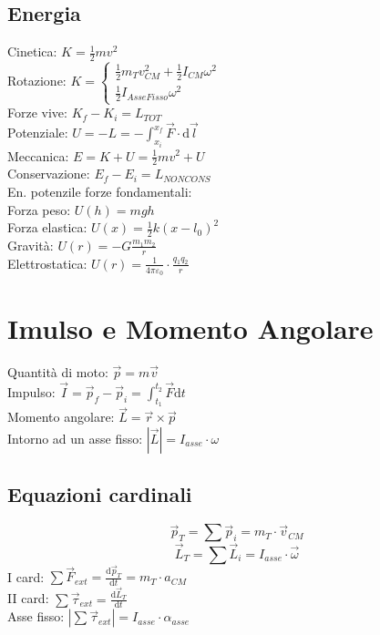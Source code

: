 \documentclass{article}
\begin{document}
\begin{small}
\begin{multicols}{3}
	\subsection{Energia}
		Cinetica: $ K = \frac{1}{2} m v^2 $ \\
		Rotazione: $ K = \begin{cases} \frac{1}{2} m_T v_{CM}^2 + \frac{1}{2} I_{CM} \omega^2 \\
				\frac{1}{2} I_{AsseFisso} \omega^2 \end{cases} $ \\
		Forze vive: $ K_f - K_i = L_{TOT} $ \\
		Potenziale: $ U = - L = - \int_{x_i}^{x_f} \vec F \cdot \mathrm d \vec l $ \\
		Meccanica: $ E = K + U = \frac{1}{2} m v^2 + U $ \\
		Conservazione: $ E_f - E_i = L_{NON CONS} $ \\
		En. potenzile forze fondamentali: \\
		Forza peso: $ U ( h ) = m g h $ \\
		Forza elastica: $ U ( x ) = \frac{1}{2} k ( x - l_0 )^2 $ \\
		Gravità: $ U( r ) = - G \frac{ m_1 m_2 }{ r } $ \\
		Elettrostatica: $ U ( r ) = \frac{1}{ 4 \pi \varepsilon_0 } \cdot \frac{ q_1 q_2 }{ r } $
\section{Imulso e Momento Angolare}
		Quantità di moto: $ \vec p = m \vec v $ \\
		Impulso: $ \vec I = \vec p_f - \vec p_i = \int_{t_1}^{t_2} \vec F \mathrm d t $ \\
		Momento angolare: $ \vec L = \vec r \times \vec p $ \\
		Intorno ad un asse fisso: $ | \vec L | = I_{asse} \cdot \omega $
	\subsection{Equazioni cardinali}
		\[ \vec p_T = \sum \vec p_i = m_T \cdot \vec v_{CM} \]
		\[ \vec L_T = \sum \vec L_i = I_{asse} \cdot \vec \omega \]
		I card: $ \sum \vec F_{ext} = \frac{ \mathrm d \vec p_T }{ \mathrm d t } = m_T \cdot a_{CM} $ \\
		II card: $ \sum \vec \tau_{ext} = \frac{ \mathrm d \vec L_T }{ \mathrm d t } $ \\
		Asse fisso: $ | \sum \vec \tau_{ext} | = I_{asse} \cdot \alpha_{asse} $

\end{multicols}
\end{small}
\end{document}
